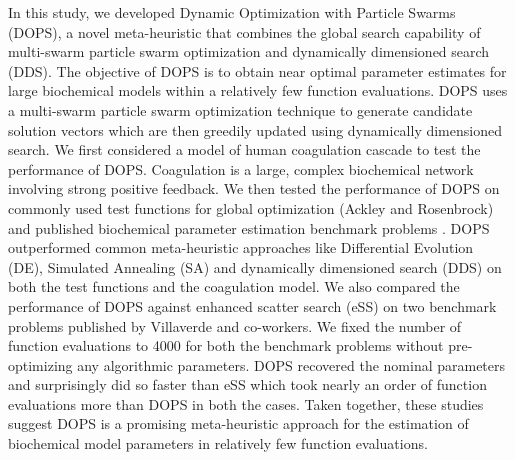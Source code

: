 \documentclass[12pt]{article}
\begin{document}


In this study, we developed Dynamic Optimization with Particle Swarms (DOPS), a novel meta-heuristic that combines the global search capability of multi-swarm particle swarm optimization and dynamically dimensioned search (DDS). The objective of DOPS is to obtain near optimal parameter estimates for large biochemical models within a relatively few function evaluations.
DOPS uses a multi-swarm particle swarm optimization technique to generate candidate solution vectors which are then greedily updated using dynamically dimensioned search. We first considered a model of human coagulation cascade to test the performance of DOPS. Coagulation is a large, complex biochemical network involving strong positive feedback.
We then tested the performance of DOPS on commonly used test functions for global optimization (Ackley and Rosenbrock) and published biochemical parameter estimation benchmark problems \cite{villaverde2015biopredyn}. DOPS outperformed common meta-heuristic approaches like Differential Evolution (DE), Simulated Annealing (SA) and dynamically dimensioned search (DDS) on both the test functions and the coagulation model.
We also compared the performance of DOPS against enhanced scatter search (eSS) on two benchmark problems published by Villaverde and co-workers\cite{villaverde2015biopredyn}. We fixed the number of function evaluations to 4000 for both the benchmark problems without pre-optimizing any algorithmic parameters. DOPS recovered the nominal parameters and surprisingly did so faster than eSS which took nearly an order of function evaluations more than DOPS in both the cases.
Taken together, these studies suggest DOPS is a promising meta-heuristic approach for the estimation of biochemical model parameters in relatively few function evaluations.
\end{document}
